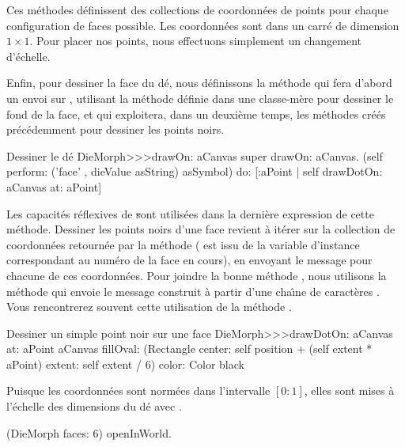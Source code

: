 \documentclass[a4paper,10pt,twoside]{book}
\begin{document}
Ces m\'ethodes d\'efinissent des collections de coordonn\'ees de
points pour chaque configuration de faces possible. Les coordonn\'ees
sont dans un carr\'e de dimension $1\times1$. Pour placer nos points,
nous effectuons simplement un changement d'\'echelle.

Enfin, pour dessiner la face du d\'e, nous d\'efinissons la m\'ethode
 qui fera d'abord un envoi sur , utilisant la m\'ethode
d\'efinie dans une classe-m\`ere pour dessiner le fond de la face, et
qui exploitera, dans un deuxi\`eme temps, les m\'ethodes cr\'e\'es
pr\'ec\'edemment pour dessiner les points noirs.

\begin{method}{Dessiner le d\'e}
DieMorph>>>drawOn: aCanvas
	super drawOn: aCanvas.
	(self perform: ('face' , dieValue asString) asSymbol)
		do: [:aPoint | self drawDotOn: aCanvas at: aPoint]
\end{method}

Les capacit\'es r\'eflexives de \st sont utilis\'ees dans la
derni\`ere expression de cette m\'ethode. Dessiner les points noirs
d'une face revient \`a it\'erer sur la collection 
de coordonn\'ees retourn\'ee par la m\'ethode  
( est issu de la variable d'instance 
correspondant au num\'ero de la face en cours),
en envoyant le message  pour chacune de ces
coordonn\'ees. Pour joindre la bonne m\'ethode %
, nous utilisons la m\'ethode  qui
envoie le message construit \`a partir d'une cha\^{\i}ne de
caract\`eres .
Vous rencontrerez souvent cette utilisation de la m\'ethode .

\begin{method}{Dessiner un simple point noir sur une face}
DieMorph>>>drawDotOn: aCanvas at: aPoint
	aCanvas
		fillOval: (Rectangle
			center: self position + (self extent * aPoint)
			extent: self extent / 6)
		color: Color black
\end{method}

Puisque les coordonn\'ees sont norm\'ees dans l'intervalle $[0{:}1]$,
elles sont mises \`a l'\'echelle des dimensions du d\'e avec 
.

\begin{code}{}
(DieMorph faces: 6) openInWorld.
\end{code}
\end{document}
